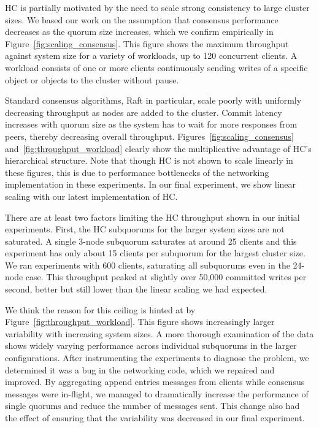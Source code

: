 \documentclass[10pt,conference]{IEEEtran}
\begin{document}
HC is partially motivated by the need to scale strong consistency to large cluster sizes.
We based our work on the assumption that consensus performance decreases as the quorum
size increases, which we confirm empirically in Figure~\ref{fig:scaling_consensus}.
This figure shows the maximum throughput against system size for a variety of workloads,
up to 120 concurrent clients.
A workload consists of one or more clients continuously sending writes of a specific
object or objects to the cluster without pause.

Standard consensus algorithms, Raft in particular, scale poorly with uniformly
decreasing throughput as nodes are added to the cluster.
Commit latency increases with quorum size as the system has to wait for more responses
from peers, thereby decreasing overall throughput.
Figures~\ref{fig:scaling_consensus} and~\ref{fig:throughput_workload}
clearly show the multiplicative advantage of HC's hierarchical structure.
Note that though HC is not shown to scale linearly in these figures, this is due to
performance bottlenecks of the networking implementation in these experiments.
In our final experiment, we show linear scaling with our latest implementation of HC.

There are at least two factors limiting the HC throughput shown in our initial experiments.
First, the HC subquorums for the larger system sizes are not saturated.
A single 3-node subquorum saturates at around 25 clients and this experiment has only
about 15 clients per subquorum for the largest cluster size.
We ran experiments with 600 clients, saturating all subquorums even in the 24-node case.
This throughput peaked at slightly over 50,000 committed writes per second, better but
still lower than the linear scaling we had expected.

We think the reason for this ceiling is hinted at by Figure~\ref{fig:throughput_workload}.
This figure shows increasingly larger variability with increasing system sizes.
A more thorough examination of the data shows widely varying performance across
individual subquorums in the larger configurations.
After instrumenting the experiments to diagnose the problem, we determined it was a bug
in the networking code, which we repaired and improved.
By aggregating append entries messages from clients while consensus messages were
in-flight, we managed to dramatically increase the performance of single quorums and
reduce the number of messages sent.
This change also had the effect of ensuring that the variability was decreased in our
final experiment.
\end{document}
